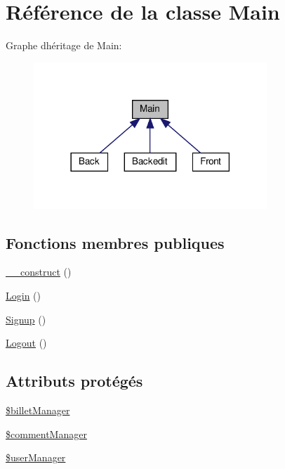 \hypertarget{class_src_1_1_controllers_1_1_main}{}\section{Référence de la classe Main}
\label{class_src_1_1_controllers_1_1_main}


Graphe d\textquotesingle{}héritage de Main\+:\nopagebreak
\begin{figure}[H]
\begin{center}
\leavevmode
\includegraphics[width=249pt]{d9/dca/class_src_1_1_controllers_1_1_main__inherit__graph}
\end{center}
\end{figure}
\subsection*{Fonctions membres publiques}
\begin{DoxyCompactItemize}
\item 
\hyperlink{class_src_1_1_controllers_1_1_main_a095c5d389db211932136b53f25f39685}{\+\_\+\+\_\+construct} ()
\item 
\hyperlink{class_src_1_1_controllers_1_1_main_a8db48c2902872da0ee80463db6696375}{Login} ()
\item 
\hyperlink{class_src_1_1_controllers_1_1_main_aba348654bb87049dfb96fa24794b191b}{Signup} ()
\item 
\hyperlink{class_src_1_1_controllers_1_1_main_aa14f760d541a59acb41ac8eefddafb9b}{Logout} ()
\end{DoxyCompactItemize}
\subsection*{Attributs protégés}
\begin{DoxyCompactItemize}
\item 
\hyperlink{class_src_1_1_controllers_1_1_main_a7205c4d22c61e375f2be552a32f97ccb}{\$billet\+Manager}
\item 
\hyperlink{class_src_1_1_controllers_1_1_main_a2fdbb2dc79956746757958a453709ca6}{\$comment\+Manager}
\item 
\hyperlink{class_src_1_1_controllers_1_1_main_afd45ca85c50f41c20a03f0a8d0f4db23}{\$user\+Manager}
\end{DoxyCompactItemize}


